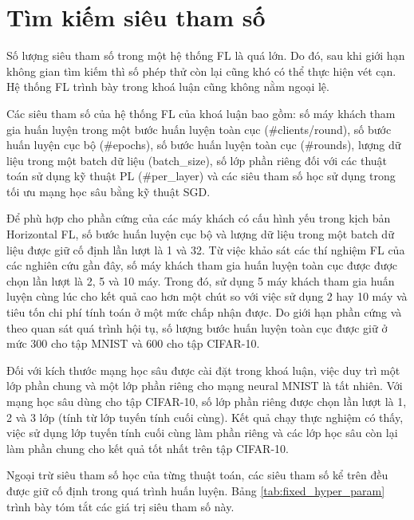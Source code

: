 \appendix

\chapter{Tìm kiếm siêu tham số}
\label{Appendix1}

Số lượng siêu tham số trong một hệ thống FL là quá lớn. Do đó, sau khi giới hạn không gian tìm kiếm thì số phép thử còn lại cũng khó có thể thực hiện vét cạn. Hệ thống FL trình bày trong khoá luận cũng không nằm ngoại lệ.

Các siêu tham số của hệ thống FL của khoá luận bao gồm: số máy khách tham gia huấn luyện trong một bước huấn luyện toàn cục (\#clients/round), số bước huấn luyện cục bộ (\#epochs), số bước huấn luyện toàn cục (\#rounds), lượng dữ liệu trong một batch dữ liệu (batch_size), số lớp phần riêng đối với các thuật toán sử dụng kỹ thuật PL (\#per_layer) và các siêu tham số học sử dụng trong tối ưu mạng học sâu bằng kỹ thuật SGD.

Để phù hợp cho phần cứng của các máy khách có cấu hình yếu trong kịch bản Horizontal FL, số bước huấn luyện cục bộ và lượng dữ liệu trong một batch dữ liệu được giữ cố định lần lượt là 1 và 32. Từ việc khảo sát các thí nghiệm FL của các nghiên cứu gần đây, số máy khách tham gia huấn luyện toàn cục được được chọn lần lượt là 2, 5 và 10 máy. Trong đó, sử dụng 5 máy khách tham gia huấn luyện cùng lúc cho kết quả cao hơn một chút so với việc sử dụng 2 hay 10 máy và tiêu tốn chi phí tính toán ở một mức chấp nhận được. Do giới hạn phần cứng và theo quan sát quá trình hội tụ, số lượng bước huấn luyện toàn cục được giữ ở mức 300 cho tập MNIST và 600 cho tập CIFAR-10.

Đối với kích thước mạng học sâu được cài đặt trong khoá luận, việc duy trì một lớp phần chung và một lớp phần riêng cho mạng neural MNIST là tất nhiên. Với mạng học sâu dùng cho tập CIFAR-10, số lớp phần riêng được chọn lần lượt là 1, 2 và 3 lớp (tính từ lớp tuyến tính cuối cùng). Kết quả chạy thực nghiệm có thấy, việc sử dụng lớp tuyến tính cuối cùng làm phần riêng và các lớp học sâu còn lại làm phần chung cho kết quả tốt nhất trên tập CIFAR-10.

Ngoại trừ siêu tham số học của từng thuật toán, các siêu tham số kể trên đều được giữ cố định trong quá trình huấn luyện. Bảng \ref{tab:fixed_hyper_param} trình bày tóm tắt các giá trị siêu tham số này.


